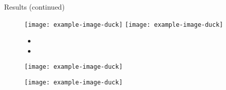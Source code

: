 \documentclass{beamer}
\newlength{\colwidth}
\begin{document}
\begin{frame}[t]
\begin{columns}[t]
\begin{column}{\colwidth}
\begin{block}{Results (continued)}
        
    \begin{figure}
        \begin{minipage}[c]{0.5\textwidth}
            \texttt{[image: example-image-duck]}
            \texttt{[image: example-image-duck]}
            
            \caption{\lipsum[1][1-3]}
            
            \colorbox[RGB]{255, 245,242}{%
            \begin{minipage}{460pt}

            \begin{itemize}
                \item \lipsum[1][1-2]
                \item \lipsum[1][1-2]
            \end{itemize}
            \end{minipage}}

        \end{minipage}\hfill
        \begin{minipage}[c]{0.5\textwidth}
            \texttt{[image: example-image-duck]}
            \caption{\lipsum[1][1-4]}
            \texttt{[image: example-image-duck]}
            \caption{\lipsum[1][1-4]}
        \end{minipage}
    \end{figure}
    

\end{block}
\end{column}
\end{columns}
\end{frame}
\end{document}
